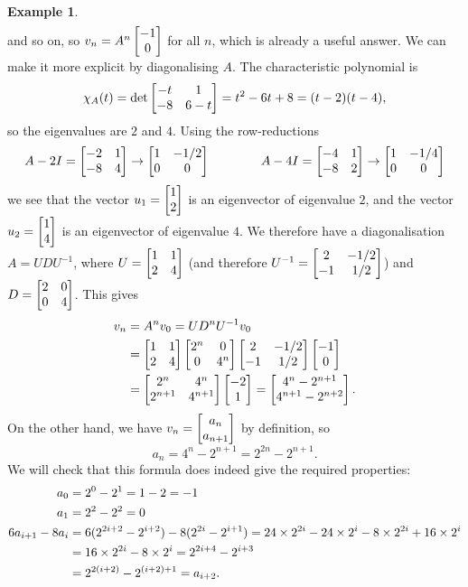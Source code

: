 \documentclass[reqno]{amsart}
\theoremstyle{definition}
\newtheorem{example}[theorem]{Example}
\begin{document}
\begin{example}
\begin{align*}
 \end{align*}
 and so on, so $v_n=A^n\left[\begin{matrix} -1\\ 0\end{matrix}\right]$ for all $n$, which is already
 a useful answer.  We can make it more explicit by diagonalising $A$.
 The characteristic polynomial is
 \[ \chi_A(t) = \det\left[\begin{matrix} -t&1 \\ -8&6-t\end{matrix}\right] =
     t^2-6t+8 = (t-2)(t-4),
 \]
 so the eigenvalues are $2$ and $4$.  Using the row-reductions
 \[ A-2I = \left[\begin{matrix} -2&1\\-8&4\end{matrix}\right] \to \left[\begin{matrix} 1&-1/2\\0&0\end{matrix}\right]
    \hspace{4em}
    A-4I = \left[\begin{matrix} -4&1\\-8&2\end{matrix}\right] \to \left[\begin{matrix} 1&-1/4\\0&0\end{matrix}\right]
 \]
 we see that the vector $u_1=\left[\begin{matrix} 1\\2\end{matrix}\right]$ is an eigenvector of
 eigenvalue $2$, and the vector $u_2=\left[\begin{matrix} 1\\4\end{matrix}\right]$ is an
 eigenvector of eigenvalue $4$.  We therefore have a diagonalisation
 $A=UDU^{-1}$, where $U=\left[\begin{matrix} 1&1\\2&4\end{matrix}\right]$ (and therefore
 $U^{-1}=\left[\begin{matrix} 2&-1/2\\-1&1/2\end{matrix}\right]$) and $D=\left[\begin{matrix} 2&0\\0&4\end{matrix}\right]$.  This
 gives 
 \begin{align*}
  v_n &= A^nv_0 = UD^nU^{-1}v_0 \\
      &= \left[\begin{matrix} 1&1\\2&4\end{matrix}\right]\left[\begin{matrix} 2^n&0\\ 0&4^n\end{matrix}\right]
         \left[\begin{matrix} 2&-1/2\\-1&1/2\end{matrix}\right]\left[\begin{matrix} -1\\0\end{matrix}\right] \\
      &= \left[\begin{matrix} 2^n & 4^n \\ 2^{n+1} & 4^{n+1} \end{matrix}\right]
         \left[\begin{matrix} -2 \\ 1 \end{matrix}\right] 
       = \left[\begin{matrix} 4^n-2^{n+1} \\ 4^{n+1}-2^{n+2} \end{matrix}\right].
 \end{align*}
 On the other hand, we have $v_n=\left[\begin{matrix} a_n\\ a_{n+1}\end{matrix}\right]$ by
 definition, so 
 \[ a_n = 4^n-2^{n+1} = 2^{2n} - 2^{n+1}. \]
 We will check that this formula does indeed give the required
 properties:
 \begin{align*}
  a_0 &= 2^0 - 2^1 = 1-2 = -1 \\
  a_1 &= 2^2 - 2^2 = 0 \\
  6a_{i+1}-8a_i
      &= 6(2^{2i+2}-2^{i+2}) - 8(2^{2i}-2^{i+1})
       = 24\times 2^{2i} - 24\times 2^i - 8 \times 2^{2i} + 16 \times 2^i \\
      &= 16\times 2^{2i} - 8\times 2^i = 2^{2i+4} - 2^{i+3} \\
      &= 2^{2(i+2)} - 2^{(i+2)+1} = a_{i+2}.
 \end{align*}
\end{example}
\end{document}
